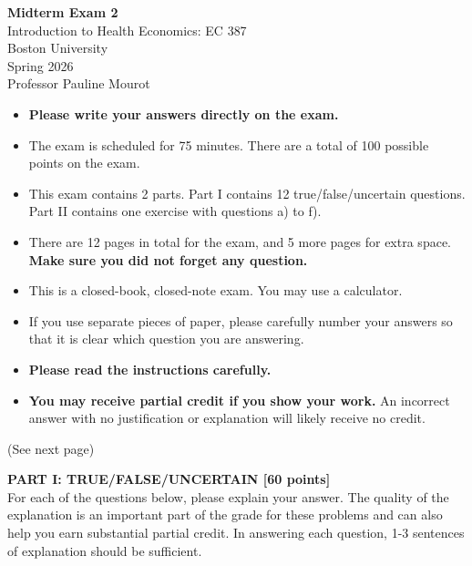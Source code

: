\documentclass[12pt]{article}
\begin{document}
\begin{center}
\textbf{Midterm Exam 2} \\
Introduction to Health Economics: EC 387 \\
Boston University \\
Spring 2026 \\
Professor Pauline Mourot
\end{center}

\vspace{1em}

\begin{itemize}
  \item  \textbf{Please write your answers directly on the exam.}

  \item The exam is scheduled for 75 minutes. There are a total of 100 possible points on the exam.  

  \item This exam contains 2 parts. Part I contains 12 true/false/uncertain questions. Part II contains one exercise with questions a) to f).
  
  \item There are 12 pages in total for the exam, and 5 more pages for extra space. \textbf{Make sure you did not forget any question.}

  \item This is a closed-book, closed-note exam. You may use a calculator.

  \item If you use separate pieces of paper, please carefully number your answers so that it is clear which question you are answering.  

  \item \textbf{Please read the instructions carefully.}

  \item \textbf{You may receive partial credit if you show your work.} An incorrect answer with no justification or explanation will likely receive no credit.
\end{itemize}

\vspace{80mm}

(See next page)
\clearpage

\noindent \textbf{PART I: TRUE/FALSE/UNCERTAIN [60 points]}\\

For each of the questions below, please explain your answer.
The quality of the explanation is an important part of the grade for these problems and
can also help you earn substantial partial credit.
In answering each question, 1-3 sentences of explanation should be sufficient.
\end{document}
